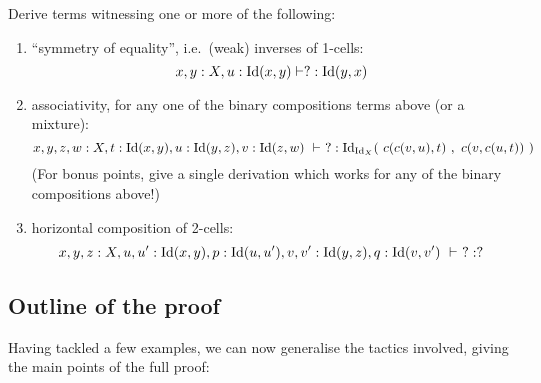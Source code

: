 \begin{exercise}Derive terms witnessing one or more of the following:
\begin{enumerate}
\item ``symmetry of equality'', i.e.\ (weak) inverses of 1-cells:
$$x,y:X, u:\mathrm{Id}(x,y) \vdash ? : \mathrm{Id}(y,x)$$

\item \label{ex:assoc}associativity, for any one of the binary compositions terms above (or a mixture):
$$x,y,z,w:X, t:\Id(x,y), u:\Id(y,z), v:\Id(z,w)\ \types\ ? : \Id_{\Id_X}(\ c(c(v,u),t)\ ,\ c(v,c(u,t))\ )$$
(For bonus points, give a single derivation which works for any of the binary compositions above!)

\item horizontal composition of 2-cells:
$$ x,y,z:X, u,u':\mathrm{Id}(x,y), p:\mathrm{Id}(u,u'), v,v':\mathrm{Id}(y,z), q:\mathrm{Id}(v,v')\ \vdash\ ? : ? $$
\end{enumerate}
\end{exercise}

\subsection{Outline of the proof}
Having tackled a few examples, we can now generalise the tactics involved, giving the main points of the full proof:

